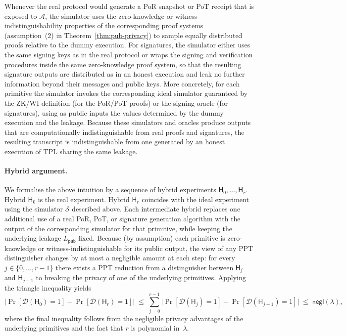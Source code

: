 \documentclass[11pt]{article}
\begin{document}
Whenever the real protocol would generate a PoR snapshot or PoT receipt that is exposed to $\mathcal{A}$, the simulator uses the zero-knowledge or witness-indistinguishability properties of the corresponding proof systems (assumption~(2) in Theorem~\ref{thm:pub-privacy}) to sample equally distributed proofs relative to the dummy execution.
For signatures, the simulator either uses the same signing keys as in the real protocol or wraps the signing and verification procedures inside the same zero-knowledge proof system, so that the resulting signature outputs are distributed as in an honest execution and leak no further information beyond their messages and public keys.
More concretely, for each primitive the simulator invokes the corresponding ideal simulator guaranteed by the ZK/WI definition (for the PoR/PoT proofs) or the signing oracle (for signatures), using as public inputs the values determined by the dummy execution and the leakage.
Because these simulators and oracles produce outputs that are computationally indistinguishable from real proofs and signatures, the resulting transcript is indistinguishable from one generated by an honest execution of TPL sharing the same leakage.

\paragraph{Hybrid argument.}
We formalise the above intuition by a sequence of hybrid experiments
$\mathsf{H}_0,\dots,\mathsf{H}_r$.
Hybrid $\mathsf{H}_0$ is the real experiment.
Hybrid $\mathsf{H}_r$ coincides with the ideal experiment using the simulator
$\mathcal{S}$ described above.
Each intermediate hybrid replaces one additional use of a real PoR, PoT, or
signature generation algorithm with the output of the corresponding simulator
for that primitive, while keeping the underlying leakage $L_{\mathsf{pub}}$
fixed.
Because (by assumption) each primitive is zero-knowledge or
witness-indistinguishable for its public output, the view of any PPT distinguisher
changes by at most a negligible amount at each step:
for every $j\in\{0,\dots,r-1\}$ there exists a PPT reduction from a distinguisher
between $\mathsf{H}_j$ and $\mathsf{H}_{j+1}$ to breaking the privacy of one of
the underlying primitives.
Applying the triangle inequality yields
\[
  \bigl|\Pr[\mathcal{D}(\mathsf{H}_0)=1] - \Pr[\mathcal{D}(\mathsf{H}_r)=1]\bigr|
  \;\leq\;
  \sum_{j=0}^{r-1}
    \bigl|\Pr[\mathcal{D}(\mathsf{H}_j)=1] - \Pr[\mathcal{D}(\mathsf{H}_{j+1})=1]\bigr|
  \;\leq\;
  \mathsf{negl}(\lambda),
\]
where the final inequality follows from the negligible privacy advantages of the
underlying primitives and the fact that $r$ is polynomial in~$\lambda$.
\end{document}
